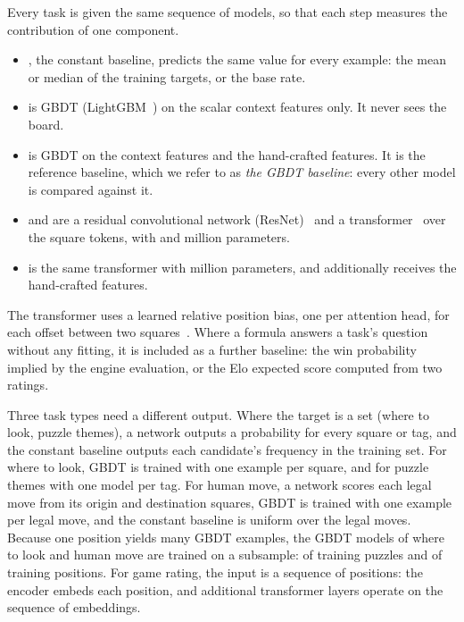 \documentclass[11pt]{article}
\begin{document}
Every task is given the same sequence of models, so that each step measures
the contribution of one component.
\begin{itemize}
\item {}, the constant baseline, predicts the same value for
every example: the mean or median of the training targets, or the base rate.
\item {} is GBDT (LightGBM~\cite{lightgbm}) on the scalar
context features only. It never sees the board.
\item {} is GBDT on the context features and the hand-crafted
features. It is the reference baseline, which we refer to as \emph{the GBDT
baseline}: every other model is compared against it.
\item {} and  are a residual
convolutional network (ResNet)~\cite{alphazero} and a
transformer~\cite{attention} over the square tokens, with
 and
 million
parameters.
\item {} is the same transformer with
 million
parameters, and  additionally receives the
hand-crafted features.
\end{itemize}
The transformer uses a learned relative position bias, one per attention
head, for each offset between two squares~\cite{relative}. Where a formula
answers a task's question without any fitting, it is included as a further
baseline: the win probability implied by the engine evaluation, or the Elo
expected score computed from two ratings.

Three task types need a different output. Where the target is a set
(where to look, puzzle themes), a network outputs a probability for every
square or tag, and the constant baseline outputs each candidate's frequency
in the training set. For where to look, GBDT is trained with one example per
square, and for puzzle themes with one model per tag. For human move, a
network scores each legal move from its origin and destination squares, GBDT
is trained with one example per legal move, and the constant baseline is
uniform over the legal moves. Because one position yields many GBDT
examples, the GBDT models of where to look and human move are trained on a
subsample:  of
 training puzzles and
 of 
training positions. For game rating, the input is a sequence of positions:
the encoder embeds each position, and additional transformer layers operate
on the sequence of embeddings.
\end{document}
